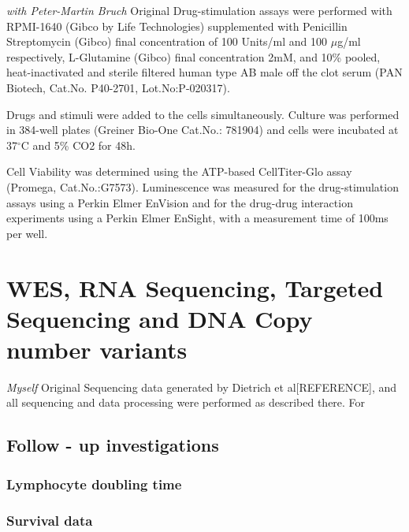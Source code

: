 \documentclass[11pt, a4paper, twosided]{book}
\begin{document}
\emph{with Peter-Martin Bruch} Original
Drug-stimulation assays were performed with RPMI-1640 (Gibco by Life Technologies) supplemented with Penicillin Streptomycin (Gibco) final concentration of 100 Units/ml and 100 \(\mu\)g/ml respectively, L-Glutamine (Gibco) final concentration 2mM, and 10\% pooled, heat-inactivated and sterile filtered human type AB male off the clot serum (PAN Biotech, Cat.No. P40-2701, Lot.No:P-020317).

Drugs and stimuli were added to the cells simultaneously. Culture was performed in 384-well plates (Greiner Bio-One Cat.No.: 781904) and cells were incubated at 37\(^\circ\)C and 5\% CO2 for 48h.

Cell Viability was determined using the ATP-based CellTiter-Glo assay (Promega, Cat.No.:G7573). Luminescence was measured for the drug-stimulation assays using a Perkin Elmer EnVision and for the drug-drug interaction experiments using a Perkin Elmer EnSight, with a measurement time of 100ms per well.

\hypertarget{wes-rna-sequencing-targeted-sequencing-and-dna-copy-number-variants}{%
\section{WES, RNA Sequencing, Targeted Sequencing and DNA Copy number variants}\label{wes-rna-sequencing-targeted-sequencing-and-dna-copy-number-variants}}

\emph{Myself} Original
Sequencing data generated by Dietrich et al{[}REFERENCE{]}, and all sequencing and data processing were performed as described there. For

\hypertarget{follow---up-investigations}{%
\subsection{Follow - up investigations}\label{follow---up-investigations}}

\hypertarget{lymphocyte-doubling-time}{%
\subsubsection{Lymphocyte doubling time}\label{lymphocyte-doubling-time}}

\hypertarget{survival-data}{%
\subsubsection{Survival data}\label{survival-data}}
\end{document}

